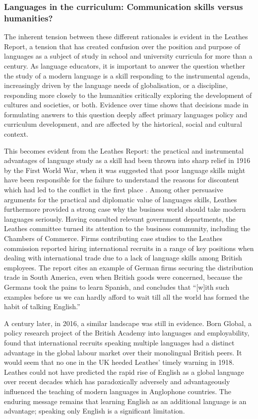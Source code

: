 \documentclass[output=paper]{langscibook}
\begin{document}
\subsubsection{Languages in the curriculum: Communication skills versus humanities?}

The inherent tension between these different rationales is evident in the Leathes Report, a tension that has created confusion over the position and purpose of languages as a subject of study in school and university curricula for more than a century. As language educators, it is important to answer the question whether the study of a modern language is a skill responding to the instrumental agenda, increasingly driven by the language needs of globalisation, or a discipline, responding more closely to the humanities \citep{Canning2009} critically exploring the development of cultures and societies, or both. Evidence over time shows that decisions made in formulating answers to this question deeply affect primary languages policy and curriculum development, and are affected by the historical, social and cultural context.

This becomes evident from the Leathes Report: the practical and instrumental advantages of language study as a skill had been thrown into sharp relief in 1916 by the First World War, when it was suggested that poor language skills might have been responsible for the failure to understand the reasons for discontent which had led to the conflict in the first place \citep{Bayley1991}. Among other persuasive arguments for the practical and diplomatic value of languages skills, Leathes furthermore provided a strong case why the business world should take modern languages seriously. Having consulted relevant government departments, the Leathes committee turned its attention to the business community, including the Chambers of Commerce. Firms contributing case studies to the Leathes commission reported hiring international recruits in a range of key positions when dealing with international trade due to a lack of language skills among British employees. The report cites an example of German firms securing the distribution trade in South America, even when British goods were concerned, because the Germans took the pains to learn Spanish, and concludes that ``[w]ith such examples before us we can hardly afford to wait till all the world has formed the habit of talking English.'' \citep{Leathes1918}

A century later, in 2016, a similar landscape was still in evidence. Born Global, a policy research project of the British Academy into languages and employability, found that international recruits speaking multiple languages had a distinct advantage in the global labour market over their monolingual British peers. It would seem that no one in the UK heeded Leathes' timely warning in 1918. Leathes could not have predicted the rapid rise of English as a global language over recent decades which has paradoxically adversely and advantageously influenced the teaching of modern languages in Anglophone countries. The enduring message remains that learning English as an additional language is an advantage; speaking only English is a significant limitation. 
\end{document}
